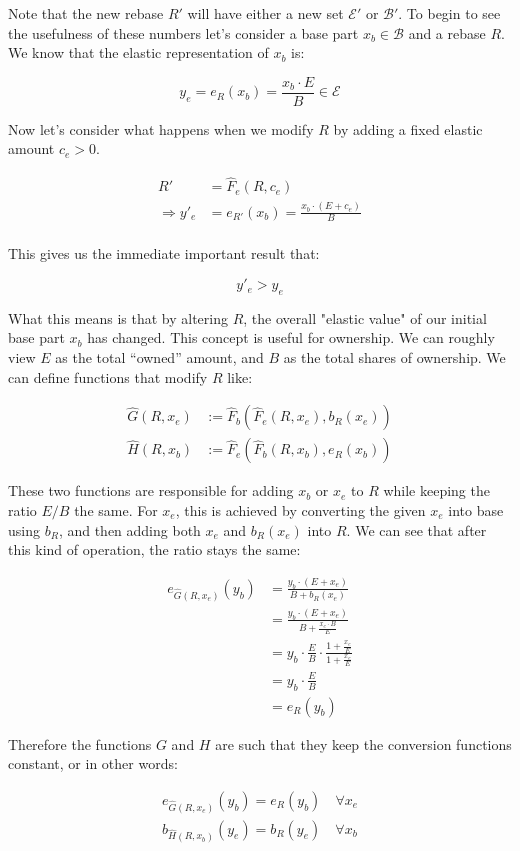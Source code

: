 \documentclass[letterpaper]{article}
\begin{document}
\begin{multicols}{2}
Note that the new rebase $R'$ will have either a new set $\mathcal{E'}$ or $\mathcal{B'}$. To begin to see the usefulness of these numbers let's consider a base part $x_b \in \mathcal{B}$ and a rebase $R$. We know that the elastic representation of $x_b$ is:

\begin{equation}
    y_e = e_R(x_b) = \frac{x_b \cdot E}{B} \in \mathcal{E}
\end{equation}

Now let's consider what happens when we modify $R$ by adding a fixed elastic amount $c_e > 0$.

\begin{align}
    \label{eq:base-ownership}
    R' &= \hat{F}_e(R, c_e) \\
    \Rightarrow y'_e &= e_{R'}(x_b) = \frac{x_b \cdot (E + c_e)}{B} \\
\end{align}

This gives us the immediate important result that:

\begin{equation}
    y'_e > y_e
\end{equation}

What this means is that by altering $R$, the overall "elastic value" of our initial base part $x_b$ has changed. This concept is useful for ownership. We can roughly view $E$ as the total ``owned'' amount, and $B$ as the total shares of ownership. We can define functions that modify $R$ like:

\begin{align}
    \label{eq:rebase-new-owner}
    \hat{G}(R, x_e) &:= \hat{F}_b(\hat{F}_e(R, x_e), b_R(x_e)) \\
    \hat{H}(R, x_b) &:= \hat{F}_e(\hat{F}_b(R, x_b), e_R(x_b))
\end{align}

These two functions are responsible for adding $x_b$ or $x_e$ to $R$ while keeping the ratio $E/B$ the same. For $x_e$, this is achieved by converting the given $x_e$ into base using $b_R$, and then adding both $x_e$ and $b_R(x_e)$ into $R$. We can see that after this kind of operation, the ratio stays the same:

\begin{align}
    e_{\hat{G}(R, x_e)}(y_b) &= \frac{y_b \cdot (E + x_e)}{B + b_R(x_e)} \\
    &= \frac{y_b \cdot (E + x_e)}{B + \frac{x_e \cdot B}{E}} \\
    &= y_b \cdot \frac{E}{B} \cdot \frac{1 + \frac{x_e}{E}}{1 + \frac{x_e}{E}} \\
    &= y_b \cdot \frac{E}{B} \\
    &= e_R(y_b)
\end{align}

Therefore the functions $G$ and $H$ are such that they keep the conversion functions constant, or in other words: 

\begin{align}
    e_{\hat{G}(R, x_e)}(y_b) = e_R(y_b) \quad \forall x_e \\
    b_{\hat{H}(R, x_b)}(y_e) = b_R(y_e) \quad \forall x_b
\end{align}

\end{multicols}
\end{document}
